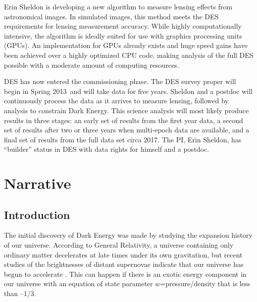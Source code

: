 \documentclass[12pt]{article}
\newcommand{\surveyproper}{Spring 2013}
\begin{document}
Erin Sheldon is developing a new algorithm to measure lensing effects from
astronomical images.  In simulated images, this method meets the DES
requirements for lensing measurement accuracy. While highly computationally
intensive, the algorithm is ideally suited for use with graphics processing
units (GPUs). An implementation for GPUs already exists and huge speed gains
have been achieved over a highly optimized CPU code, making analysis of the
full DES possible with a moderate amount of computing resources.

DES has now entered the commissioning phase.  The DES survey proper will begin
in \surveyproper\ and will take data for five years. Sheldon and a postdoc will
continuously process the data as it arrives to measure lensing, followed by
analysis to constrain Dark Energy.  This science analysis will most likely
produce results in three stages: an early set of results from the first year
data, a second set of results after two or three years when multi-epoch data
are available, and a final set of results from the full data set circa 2017.
The PI, Erin Sheldon, has ``builder'' status in DES with data rights for
himself and a postdoc. 

\newpage

\tableofcontents
\newpage
\setcounter{page}{1}
\section*{Narrative}
\setcounter{section}{1}
\subsection{Introduction}

The initial discovery of Dark Energy was made by studying the expansion history
of our universe.  According to General Relativity, a universe containing only
ordinary matter decelerates at late times under its own gravitation, but recent
studies of the brightnesses of distant supernovae indicate that our universe
has begun to accelerate \cite{Riess98,Perlmutter99}.  This can happen if there
is an exotic energy component in our universe with an equation of state
parameter $w$=pressure/density that is less than --1/3.
\end{document}
